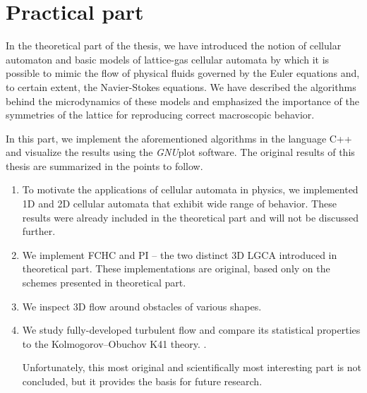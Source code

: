 

\chapter{Practical part}

In the theoretical part of the thesis, we have introduced the notion of cellular automaton and basic models of lattice-gas cellular automata by which it is possible to mimic the flow of physical fluids governed by the Euler equations and, to certain extent, the Navier-Stokes equations.
We have described the algorithms behind the microdynamics of these models and emphasized the importance of the symmetries of the lattice for reproducing correct macroscopic behavior.

In this part, we implement the aforementioned algorithms in the language C++ and visualize the results using the \textit{GNU}plot software. The original results of this thesis are summarized in the points to follow.



\begin{enumerate}
\item To motivate the applications of cellular automata in physics, we implemented 1D and 2D cellular automata that exhibit wide range of behavior. These results were already included in the theoretical part and will not be discussed further.
\item We implement FCHC and PI -- the two distinct 3D LGCA introduced in theoretical part. These implementations are original, based only on the schemes presented in theoretical part.
\item We inspect 3D flow around obstacles of various shapes.
\item We study fully-developed turbulent flow and compare its statistical pro\-perties to the Kolmogorov--Obuchov K41 theory. \cite{wolf}.

Unfortunately, this most original and scientifically most interesting part is not concluded, but it provides the basis for future research. 

\end{enumerate}
